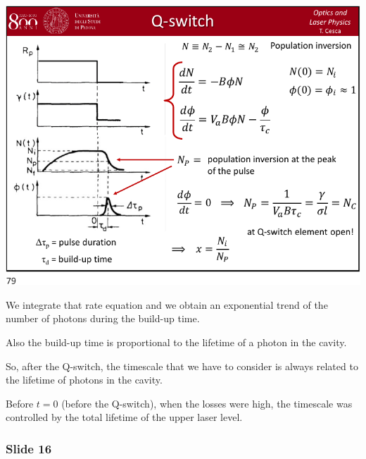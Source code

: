 \documentclass[../main/main.tex]{subfiles}
\begin{document}
\begin{minipage}[]{0.5\linewidth}
\centering
\includegraphics[page=15,width=1\textwidth]{../lessons/pdf_file/15_lecture.pdf}
\end{minipage}
\hspace{0.3cm}\vspace{0.3cm}
\begin{minipage}[c]{0.47\linewidth}

We integrate that rate equation and we obtain an exponential trend of the number of photons during the build-up time.

Also the build-up time is proportional to the lifetime of a photon in the cavity.

So, after the Q-switch, the timescale that we have to consider is always related to the lifetime of photons in the cavity.

Before \( t=0 \) (before the Q-switch), when the losses were high, the timescale was controlled by the total lifetime of the upper laser level.

\end{minipage}

\subsubsection*{Slide 16}
\end{document}
